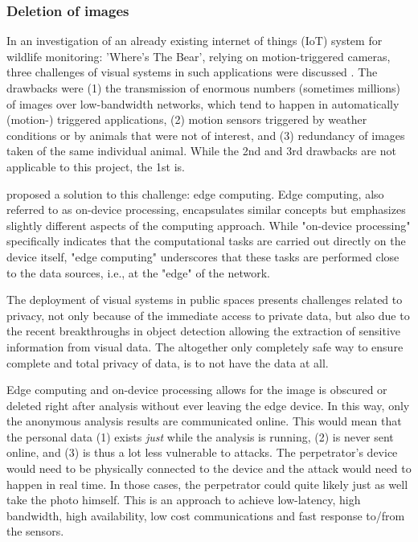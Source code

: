 \subsubsection{Deletion of images}
\label{sec:deletion_of_images}
In an investigation of an already existing internet of things (IoT) system for wildlife monitoring: 'Where's The Bear', relying on motion-triggered cameras, three challenges of visual systems in such applications were discussed \cite{el2017WTB}. The drawbacks were (1) the transmission of enormous numbers (sometimes millions) of images over low-bandwidth networks, which tend to happen in automatically (motion-) triggered applications, (2) motion sensors triggered by weather conditions or by animals that were not of interest, and (3) redundancy of images taken of the same individual animal. While the 2nd and 3rd drawbacks are not applicable to this project, the 1st is.

\citeauthor{el2017WTB} proposed a solution to this challenge: edge computing. Edge computing, also referred to as on-device processing, encapsulates similar concepts but emphasizes slightly different aspects of the computing approach. While "on-device processing" specifically indicates that the computational tasks are carried out directly on the device itself, "edge computing" underscores that these tasks are performed close to the data sources, i.e., at the "edge" of the network.

The deployment of visual systems in public spaces presents challenges related to privacy, not only because of the immediate access to private data, but also due to the recent breakthroughs in object detection allowing the extraction of sensitive information from visual data. The altogether only completely safe way to ensure complete and total privacy of data, is to not have the data at all.

Edge computing and on-device processing allows for the image is obscured or deleted right after analysis without ever leaving the edge device. In this way, only the anonymous analysis results are communicated online. This would mean that the personal data (1) exists \textit{just} while the analysis is running, (2) is never sent online, and (3) is thus a lot less vulnerable to attacks. The perpetrator's device would need to be physically connected to the device and the attack would need to happen in real time. In those cases, the perpetrator could quite likely just as well take the photo himself. This is an approach to achieve low-latency, high bandwidth, high availability, low cost communications and fast response to/from the sensors.

